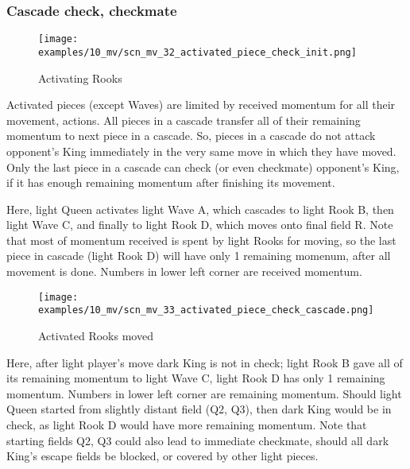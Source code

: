 \clearpage %

\subsubsection*{Cascade check, checkmate}

\vspace*{-1.4\baselineskip}
\noindent
\begin{figure}[!h]
\texttt{[image: examples/10\_mv/scn\_mv\_32\_activated\_piece\_check\_init.png]}
\vspace*{-1.3\baselineskip}
\caption{Activating Rooks}
\label{fig:scn_mv_32_activated_piece_check_init}
\end{figure}

\vspace*{-0.3\baselineskip}
Activated pieces (except Waves) are limited by received momentum for all their movement,
actions. All pieces in a cascade transfer all of their remaining momentum to next piece
in a cascade. So, pieces in a cascade do not attack opponent's King immediately in the
very same move in which they have moved. Only the last piece in a cascade can check (or
even checkmate) opponent's King, if it has enough remaining momentum after finishing its
movement.

Here, light Queen activates light Wave A, which cascades to light Rook B, then light
Wave C, and finally to light Rook D, which moves onto final field R. Note that most
of momentum received is spent by light Rooks for moving, so the last piece in cascade
(light Rook D) will have only 1 remaining momenum, after all movement is done. Numbers
in lower left corner are received momentum.

\clearpage %

\vspace*{-2.1\baselineskip}
\noindent
\begin{figure}[!h]
\texttt{[image: examples/10\_mv/scn\_mv\_33\_activated\_piece\_check\_cascade.png]}
\caption{Activated Rooks moved}
\label{fig:scn_mv_33_activated_piece_check_cascade}
\end{figure}

Here, after light player's move dark King is not in check; light Rook B gave all of its
remaining momentum to light Wave C, light Rook D has only 1 remaining momentum. Numbers
in lower left corner are remaining momentum. Should light Queen started from slightly
distant field (Q2, Q3), then dark King would be in check, as light Rook D would have
more remaining momentum. Note that starting fields Q2, Q3 could also lead to immediate
checkmate, should all dark King's escape fields be blocked, or covered by other light
pieces.

